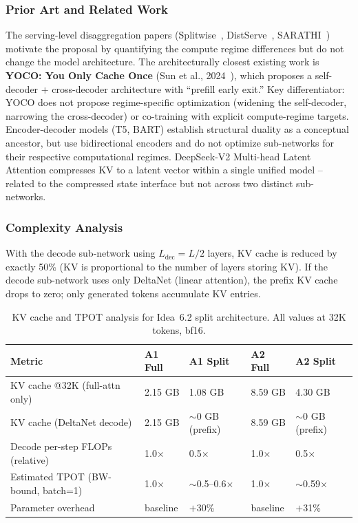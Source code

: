 \documentclass[11pt]{article}
\begin{document}
\subsubsection*{Prior Art and Related Work}

The serving-level disaggregation papers (Splitwise~\cite{patel2023splitwise}, DistServe~\cite{zhong2024distserve}, SARATHI~\cite{agrawal2023sarathi}) motivate the proposal by quantifying the compute regime differences but do not change the model architecture. The architecturally closest existing work is \textbf{YOCO: You Only Cache Once} (Sun et al., 2024~\cite{sun2024yoco}), which proposes a self-decoder + cross-decoder architecture with ``prefill early exit.'' Key differentiator: YOCO does not propose regime-specific optimization (widening the self-decoder, narrowing the cross-decoder) or co-training with explicit compute-regime targets. Encoder-decoder models (T5, BART) establish structural duality as a conceptual ancestor, but use bidirectional encoders and do not optimize sub-networks for their respective computational regimes. DeepSeek-V2 Multi-head Latent Attention compresses KV to a latent vector within a single unified model -- related to the compressed state interface but not across two distinct sub-networks.

\subsubsection*{Complexity Analysis}

With the decode sub-network using $L_\text{dec} = L/2$ layers, KV cache is reduced by exactly 50\% (KV is proportional to the number of layers storing KV). If the decode sub-network uses only DeltaNet (linear attention), the prefix KV cache drops to zero; only generated tokens accumulate KV entries.

\begin{table}[h]
\centering
\caption{KV cache and TPOT analysis for Idea~6.2 split architecture. All values at 32K tokens, bf16.}
\label{tab:idea62_complexity}
\small
\begin{tabular}{lllll}
\hline
\textbf{Metric} & \textbf{A1 Full} & \textbf{A1 Split} & \textbf{A2 Full} & \textbf{A2 Split} \\
\hline
KV cache @32K (full-attn only) & 2.15 GB & 1.08 GB & 8.59 GB & 4.30 GB \\
KV cache (DeltaNet decode) & 2.15 GB & $\sim$0 GB (prefix) & 8.59 GB & $\sim$0 GB (prefix) \\
Decode per-step FLOPs (relative) & 1.0$\times$ & 0.5$\times$ & 1.0$\times$ & 0.5$\times$ \\
Estimated TPOT (BW-bound, batch=1) & 1.0$\times$ & $\sim$0.5--0.6$\times$ & 1.0$\times$ & $\sim$0.59$\times$ \\
Parameter overhead & baseline & $+$30\% & baseline & $+$31\% \\
\hline
\end{tabular}
\end{table}
\end{document}
